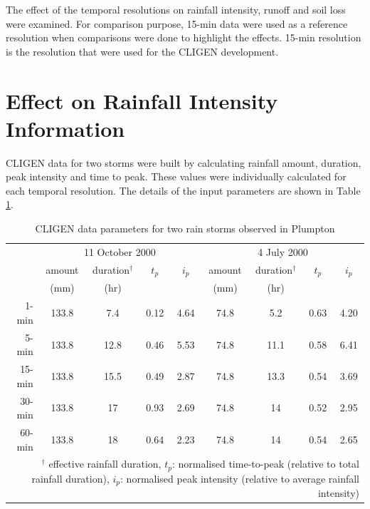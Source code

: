 The effect of the temporal resolutions on rainfall intensity, runoff and soil
loss were examined. For comparison purpose, 15-min data were used as a reference
resolution when comparisons were done to highlight the effects. 15-min
resolution is the resolution that were used for the CLIGEN development.


\section{Effect on Rainfall Intensity Information}
\label{sec:EffectsOnRainfallIntensityInput}

CLIGEN data for two storms were built by calculating rainfall amount, duration,
peak intensity and time to peak. These values were individually calculated for
each temporal resolution. The details of the input parameters are shown in Table
\ref{tab:CLIGENWEPPInputFileParameters}.

\begin{table}[htbp]
  \centering
  \small
  \caption{CLIGEN data parameters for two rain storms observed in
Plumpton}
  \label{tab:CLIGENWEPPInputFileParameters}
    \begin{tabular}{rcccccccc} \toprule
       & \multicolumn{4}{c}{11 October 2000} &
\multicolumn{4}{c}{4 July 2000}\\
       \cmidrule(r){2-5} \cmidrule(l){6-9}
       & amount & duration$^{\dagger}$ & $t_p$ & $i_p$ & amount &
duration$^{\dagger}$ & $t_p$ & $i_p$\\
       & \scriptsize(mm) & \scriptsize(hr) & & & \scriptsize(mm) &
\scriptsize(hr) & & \\
       \midrule
      1-min  & 133.8 & 7.4  & 0.12 & 4.64 & 74.8 & 5.2  & 0.63 & 4.20\\
      5-min  & 133.8 & 12.8 & 0.46 & 5.53 & 74.8 & 11.1 & 0.58 & 6.41\\
      15-min & 133.8 & 15.5 & 0.49 & 2.87 & 74.8 & 13.3 & 0.54 & 3.69\\
      30-min & 133.8 & 17   & 0.93 & 2.69 & 74.8 & 14   & 0.52 & 2.95\\
      60-min & 133.8 & 18   & 0.64 & 2.23 & 74.8 & 14   & 0.54 & 2.65\\
      \bottomrule
      \multicolumn{9}{p{12cm}}{\footnotesize $^\dagger$ effective rainfall
duration, {\normalsize{$t_p$}}: normalised time-to-peak (relative to total
rainfall duration), {\normalsize{$i_p$}}: normalised peak intensity (relative
to average rainfall intensity)}
    \end{tabular}
\end{table}


